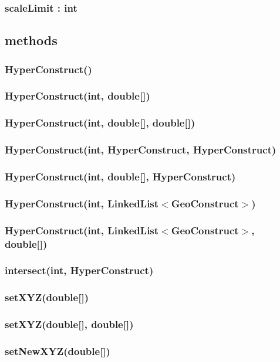 \documentclass[a4paper,10pt]{report}
\begin{document}
\subsubsection{scaleLimit : int}
\subsection{methods}
\subsubsection{HyperConstruct()}
\subsubsection{HyperConstruct(int, double[])}
\subsubsection{HyperConstruct(int, double[], double[])}
\subsubsection{HyperConstruct(int, HyperConstruct, HyperConstruct)}
\subsubsection{HyperConstruct(int, double[], HyperConstruct)}
\subsubsection{HyperConstruct(int, LinkedList$<$GeoConstruct$>$)}
\subsubsection{HyperConstruct(int, LinkedList$<$GeoConstruct$>$, double[])}
\subsubsection{intersect(int, HyperConstruct)}
\subsubsection{setXYZ(double[])}
\subsubsection{setXYZ(double[], double[])}
\subsubsection{setNewXYZ(double[])}
\end{document}
